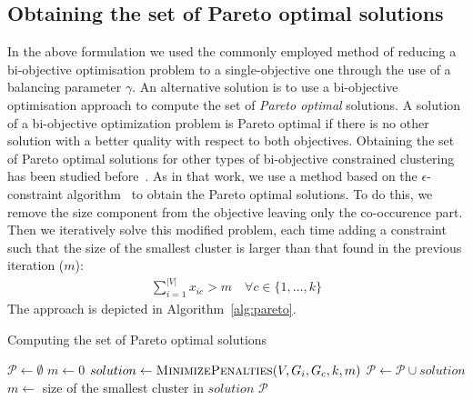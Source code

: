 \documentclass[conference]{IEEEtran}
\newcommand{\NDTi}[1]{\todo[inline,bordercolor=ghue,color=ghue!40]{Tias: #1}}
\begin{document}
\subsection{Obtaining the set of Pareto optimal solutions} \label{sec:pareto}
In the above formulation we used the commonly employed method of reducing a bi-objective optimisation problem to a single-objective one through the use of a balancing parameter $\gamma$. An alternative solution is to use a bi-objective optimisation approach to compute the set of \emph{Pareto optimal} solutions. A solution of a bi-objective optimization problem is Pareto optimal if there is no other solution with a better quality with respect to both objectives. Obtaining the set of Pareto optimal solutions for other types of bi-objective constrained clustering has been studied before~\cite{GunsDVD16}. As in that work, we use a method based on the $\epsilon$-constraint algorithm~\cite{DBLP0015143} to obtain the Pareto optimal solutions. To do this, we remove the size component from the objective leaving only the co-occurence part. Then we iteratively solve this modified problem, each time adding a constraint such that the size of the smallest cluster is larger than that found in the previous iteration ($m$):
%
\begin{align}
\sum_{i=1}^{|V|} x_{ic} > m \quad \forall c \in \{1, \ldots, k\}
\end{align}
The approach is depicted in Algorithm~\ref{alg:pareto}.

\begin{algorithm}[t]
\centering
\caption{Computing the set of Pareto optimal solutions}
\label{alg:pareto}
\begin{algorithmic}[1]
\State $\mathcal{P} \gets \emptyset$ 
\State $m \gets 0$ 
\Repeat
	\State $solution \gets \textsc{MinimizePenalties}(V, G_i, G_c, k, m)$
	\State $\mathcal{P} \gets \mathcal{P} \cup solution$
	\State $m \gets$ size of the smallest cluster in $solution$
\State \Return $\mathcal{P}$
\end{algorithmic}
\end{algorithm}

\end{document}
